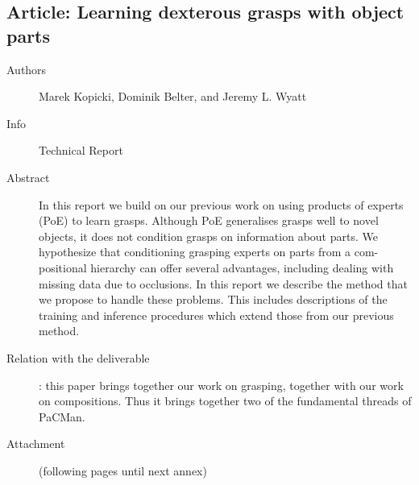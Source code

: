 \documentclass[a4paper,11pt,pdf]{pacmanreport}
\begin{document}
\subsection{Article: Learning dexterous grasps with object parts}
\label{ann:GraspingCompositions}
\begin{description}
    \item[Authors] Marek Kopicki, Dominik Belter, and Jeremy L. Wyatt
    \item[Info] Technical Report
    \item[Abstract] In this report we build on our previous work on using products of
experts (PoE) to learn grasps. Although PoE generalises grasps well to
novel objects, it does not condition grasps on information about parts.
We hypothesize that conditioning grasping experts on parts from a com-
positional hierarchy can offer several advantages, including dealing with
missing data due to occlusions. In this report we describe the method that
we propose to handle these problems. This includes descriptions of the
training and inference procedures which extend those from our previous
method.

    \item[Relation with the deliverable]: this paper brings together our work on grasping, together with our work on compositions. Thus it brings together two of the fundamental threads of PaCMan.
    \item[Attachment] (following pages until next annex)
\end{description}

\end{document}
